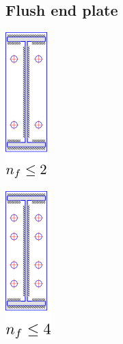 \documentclass[11.5pt,a4paper,oneside]{report}
\begin{document}
\begin{Form}
\subsection{Flush end plate}
	\begin{multicols}{2}
		\begin{center}
			\includegraphics{bolt_layout1.png}
		\end{center}
		\begin{center}
			\includegraphics{bolt_layout2.png}
		\end{center}
	\end{multicols}
\clearpage

\end{Form}
\end{document}
